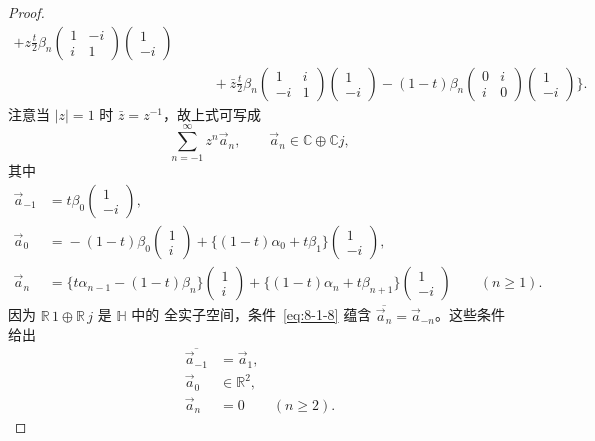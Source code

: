 \begin{proof}
\[\begin{aligned}
 +z\frac t2\beta_n
  \begin{pmatrix}1&-i\\i&1\end{pmatrix}
  \begin{pmatrix}1\\-i\end{pmatrix}
 \\
 &\qquad
 +\bar z\frac t2\beta_n
  \begin{pmatrix}1&i\\-i&1\end{pmatrix}
  \begin{pmatrix}1\\-i\end{pmatrix}
 -(1-t)\beta_n
  \begin{pmatrix}0&i\\i&0\end{pmatrix}
  \begin{pmatrix}1\\-i\end{pmatrix}
 \Biggr\}.
\end{aligned}
\]
注意当 $|z|=1$ 时 $\bar z=z^{-1}$，故上式可写成
\[
 \sum_{n=-1}^{\infty}z^n\vec a_n,
 \qquad \vec a_n\in\mathbb C\oplus\mathbb Cj,
\]
其中
\[
\begin{aligned}
 \vec a_{-1}
 &={}
 t\beta_0\begin{pmatrix}1\\-i\end{pmatrix},
 \\
 \vec a_0
 &={}
 -(1-t)\beta_0\begin{pmatrix}1\\i\end{pmatrix}
 +\{(1-t)\alpha_0+t\beta_1\}
  \begin{pmatrix}1\\-i\end{pmatrix},
 \\
 \vec a_n
 &={}
 \{t\alpha_{n-1}-(1-t)\beta_n\}
  \begin{pmatrix}1\\i\end{pmatrix}
 +\{(1-t)\alpha_n+t\beta_{n+1}\}
  \begin{pmatrix}1\\-i\end{pmatrix}
 \qquad(n\geq1).
\end{aligned}
\]
因为 $\mathbb R\,1\oplus\mathbb R\,j$ 是 $\mathbb H$ 中的
全实子空间，条件~\eqref{eq:8-1-8} 蕴含
$\overline{\vec a_n}=\vec a_{-n}$。这些条件给出
\begin{align}
 \overline{\vec a_{-1}}&=\vec a_1,
  \tag{8.1.9.1}\label{eq:8-1-9-1}\\
 \vec a_0&\in\mathbb R^2,
  \tag{8.1.9.2}\label{eq:8-1-9-2}\\
 \vec a_n&=0\qquad(n\geq2).
  \tag{8.1.9.3}\label{eq:8-1-9-3}
\end{align}


\end{proof}
